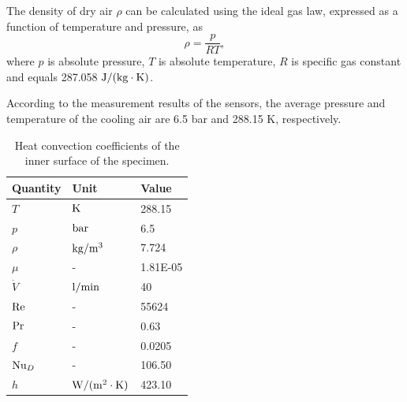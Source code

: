 \documentclass[preprint,5p,twocolumn,10pt,sort&compress]{elsarticle}
\begin{document}
The density of dry air $\rho$ can be calculated using the ideal gas law, expressed as a function of temperature and pressure, as 
\begin{equation}
\rho  = \frac{p}{{RT}},
\label{Equ:AirDensity}
\end{equation}
where
$p$ is absolute pressure,
$T$ is absolute temperature,
$R$ is specific gas constant and equals 287.058 ${\rm{J/(kg}} \cdot {\rm{K}})$.

According to the measurement results of the sensors, the average pressure and temperature of the cooling air are 6.5 bar and 288.15 K, respectively.

\begin{table}[!ht]
\centering
  \begin{threeparttable}
  \centering
  \caption{Heat convection coefficients of the inner surface of the specimen.}
    \begin{tabular}{p{2cm}p{2cm}p{2cm}}
    \toprule
    Quantity   & Unit & Value  \\
    \midrule
    $T$   & ${\rm{K}}$ & 288.15  \\
    $p$   & ${\rm{bar}}$ & 6.5   \\
    $\rho$& ${\rm{kg/}}{{\rm{m}}^{\rm{3}}}$ & 7.724 \\
    $\mu$ & -     & 1.81E-05 \\
    ${\dot V}$ & ${\rm{l/min}}$ & 40  \\
    ${\rm{Re}}$ & -     & 55624  \\
    ${\rm{Pr}}$ & -     & 0.63  \\
    $f $ & -     & 0.0205  \\
    ${\rm{N}}{{\rm{u}}_D} $ & -     & 106.50  \\
    $h $ & ${\rm{W/(}}{{\rm{m}}^{\rm{2}}} \cdot {\rm{K)}}$ & 423.10  \\
    \bottomrule
    \end{tabular}%
    \end{threeparttable}
  \label{tab:addlabel}%
\end{table}%
\renewcommand\arraystretch{1}
\end{document}
